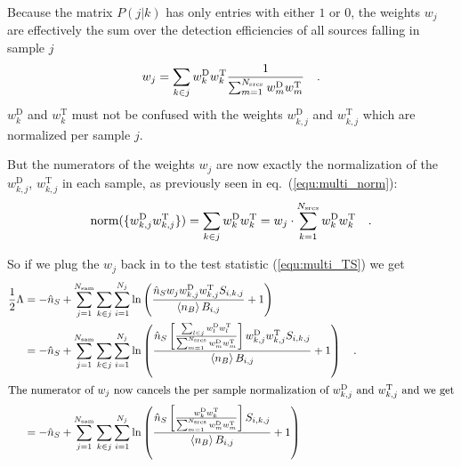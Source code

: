 Because the matrix $P(j|k)$ has only entries with either $1$ or $0$, the weights $w_j$ are effectively the sum over the detection efficiencies of all sources falling in sample $j$
\begin{equation}
  w_j = \sum_{k\in j} w^\text{D}_k w^\text{T}_k
        \frac{1}{\sum_{m=1}^{N_\text{srcs}} w^\text{D}_m w^\text{T}_m}
      \quad\text{.}
\end{equation}
$w^\text{D}_k$ and $w^\text{T}_k$ must not be confused with the weights $w_{k,j}^\text{D}$ and $w_{k,j}^\text{T}$ which are normalized per sample $j$.

But the numerators of the weights $w_j$ are now exactly the normalization of the $w_{k,j}^\text{D}$, $w_{k,j}^\text{T}$ in each sample, as previously seen in eq.~(\ref{equ:multi_norm}):
\begin{equation}
  \text{norm}(\{w_{k,j}^\text{D}w_{k,j}^\text{T}\})
    = \sum_{k\in j} w^\text{D}_k w^\text{T}_k
    = w_j \cdot \sum_{k=1}^{N_\text{srcs}} w^\text{D}_k w^\text{T}_k
  \quad\text{.}
\end{equation}

So if we plug the $w_j$ back in to the test statistic (\ref{equ:multi_TS}) we get
\begin{align}
  \frac{1}{2}\Lambda &=
    -\hat{n}_S + \sum_{j=1}^{N_\text{sam}}
            \sum_{k\in j}\sum_{i=1}^{N_j} \ln\left(
              \frac{\hat{n}_S w_j w_{k,j}^\text{D}w_{k,j}^\text{T}S_{i,k,j}}
                   {\Braket{n_B} B_{i,j}} + 1 \right) \\
    &= -\hat{n}_S + \sum_{j=1}^{N_\text{sam}}
            \sum_{k\in j}\sum_{i=1}^{N_j} \ln\left(
              \frac{\hat{n}_S \left[
                      \frac{\sum_{l\in j} w^\text{D}_l w^\text{T}_l }
                           {\sum_{m=1}^{N_\text{srcs}} w^\text{D}_m w^\text{T}_m}
                      \right] w_{k,j}^\text{D}w_{k,j}^\text{T}S_{i,k,j}}
                   {\Braket{n_B} B_{i,j}} + 1 \right)
       \quad\text{.} \\
  \intertext{The numerator of $w_j$ now cancels the per sample normalization of $w_{k,j}^\text{D}$ and $w_{k,j}^\text{T}$ and we get}
    &= -\hat{n}_S + \sum_{j=1}^{N_\text{sam}}
            \sum_{k\in j}\sum_{i=1}^{N_j} \ln\left(
              \frac{\hat{n}_S \left[
                      \frac{ w_k^\text{D}w_k^\text{T} }
                           {\sum_{m=1}^{N_\text{srcs}} w^\text{D}_m w^\text{T}_m}
                      \right] S_{i,k,j}}
                   {\Braket{n_B} B_{i,j}} + 1 \right)
\end{align}

